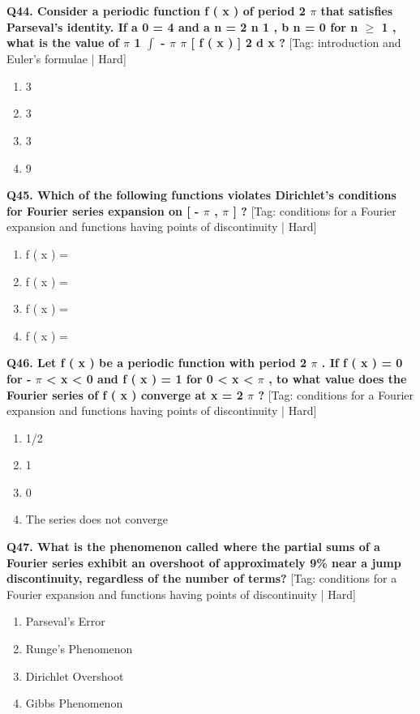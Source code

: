 \noindent\textbf{Q44. Consider a periodic function f ( x ) of period 2 $\pi$ that satisfies Parseval's identity. If a 0 = 4 and a n = 2 n 1 , b n = 0 for n $\ge$ 1 , what is the value of $\pi$ 1 $\int$ - $\pi$ $\pi$ [ f ( x ) ] 2 d x ?} \hfill [Tag: introduction and Euler's formulae | Hard]
\begin{enumerate}[label=(\alph*),topsep=2pt,itemsep=1pt,partopsep=0pt,parsep=0pt]
    \item {{3}}
    \item {{3}}
    \item {{3}}
    \item {{9}}
\end{enumerate}
\vspace{2mm}

\noindent\textbf{Q45. Which of the following functions violates Dirichlet's conditions for Fourier series expansion on [ - $\pi$ , $\pi$ ] ?} \hfill [Tag: conditions for a Fourier expansion and functions having points of discontinuity | Hard]
\begin{enumerate}[label=(\alph*),topsep=2pt,itemsep=1pt,partopsep=0pt,parsep=0pt]
    \item {{f ( x ) =}}
    \item {{f ( x ) =}}
    \item {{f ( x ) =}}
    \item {{f ( x ) =}}
\end{enumerate}
\vspace{2mm}

\noindent\textbf{Q46. Let f ( x ) be a periodic function with period 2 $\pi$ . If f ( x ) = 0 for - $\pi$ < x < 0 and f ( x ) = 1 for 0 < x < $\pi$ , to what value does the Fourier series of f ( x ) converge at x = 2 $\pi$ ?} \hfill [Tag: conditions for a Fourier expansion and functions having points of discontinuity | Hard]
\begin{enumerate}[label=(\alph*),topsep=2pt,itemsep=1pt,partopsep=0pt,parsep=0pt]
    \item {{1/2}}
    \item {{1}}
    \item {{0}}
    \item {{The series does not converge}}
\end{enumerate}
\vspace{2mm}

\noindent\textbf{Q47. What is the phenomenon called where the partial sums of a Fourier series exhibit an overshoot of approximately 9\% near a jump discontinuity, regardless of the number of terms?} \hfill [Tag: conditions for a Fourier expansion and functions having points of discontinuity | Hard]
\begin{enumerate}[label=(\alph*),topsep=2pt,itemsep=1pt,partopsep=0pt,parsep=0pt]
    \item {{Parseval's Error}}
    \item {{Runge's Phenomenon}}
    \item {{Dirichlet Overshoot}}
    \item {{Gibbs Phenomenon}}
\end{enumerate}
\vspace{2mm}

